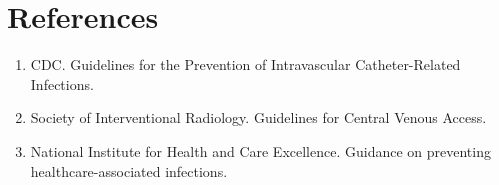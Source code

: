 \section*{References}
\begin{enumerate}
\item CDC. Guidelines for the Prevention of Intravascular Catheter-Related Infections.
\item Society of Interventional Radiology. Guidelines for Central Venous Access.
\item National Institute for Health and Care Excellence. Guidance on preventing healthcare-associated infections.
\end{enumerate}
